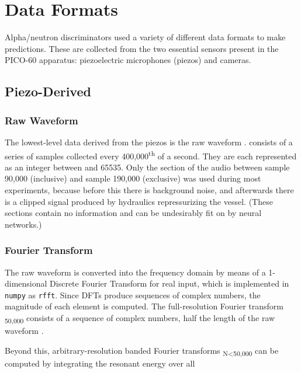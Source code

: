 \documentclass[12pt]{article}
\begin{document}
\section{Data Formats}

Alpha/neutron discriminators used a variety of different data formats to make predictions. These are collected from the two essential sensors present in the PICO-60 apparatus: piezoelectric microphones (piezos) and cameras.

\subsection{Piezo-Derived}

\subsubsection{Raw Waveform}

The lowest-level data derived from the piezos is the raw waveform \textomega. \textomega{} consists of a series of samples collected every 400,000\textsuperscript{th} of a second. They are each represented as an integer between  and 65535. Only the section of the audio between sample 90,000 (inclusive) and sample 190,000 (exclusive) was used during most experiments, because before this there is background noise, and afterwards there is a clipped signal produced by hydraulics repressurizing the vessel. (These sections contain no information and can be undesirably fit on by neural networks.)

\subsubsection{Fourier Transform}

The raw waveform \textomega{} is converted into the frequency domain by means of a 1-dimensional Discrete Fourier Transform for real input, which is implemented in \texttt{numpy} as \texttt{rfft}. Since DFTs produce sequences of complex numbers, the magnitude of each element is computed. The full-resolution Fourier transform \textbeta \textsubscript{50,000} consists of a sequence of complex numbers, half the length of the raw waveform \textomega.

Beyond this, arbitrary-resolution banded Fourier transforms \textbeta \textsubscript{N\textless50,000} can be computed by integrating the resonant energy over all
\end{document}
